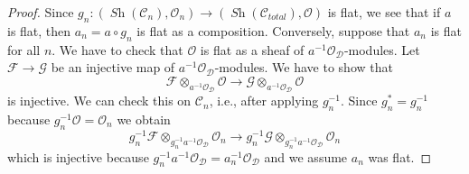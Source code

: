 \documentclass{stacks-project}
\theoremstyle{plain}
\theoremstyle{definition}
\theoremstyle{remark}
\numberwithin{equation}{subsection}
\def\Sh{\mathop{\mathit{Sh}}\nolimits}
\begin{document}
\begin{proof}
Since $g_n : (\Sh(\mathcal{C}_n), \mathcal{O}_n) \to
(\Sh(\mathcal{C}_{total}), \mathcal{O})$ is flat, we see
that if $a$ is flat, then $a_n = a \circ g_n$ is flat as
a composition. Conversely, suppose that $a_n$ is flat for all $n$.
We have to check that $\mathcal{O}$ is flat as a sheaf of
$a^{-1}\mathcal{O}_\mathcal{D}$-modules. Let $\mathcal{F} \to \mathcal{G}$
be an injective map of $a^{-1}\mathcal{O}_\mathcal{D}$-modules.
We have to show that
$$
\mathcal{F} \otimes_{a^{-1}\mathcal{O}_\mathcal{D}} \mathcal{O}
\to
\mathcal{G} \otimes_{a^{-1}\mathcal{O}_\mathcal{D}} \mathcal{O}
$$
is injective. We can check this on $\mathcal{C}_n$, i.e., after
applying $g_n^{-1}$. Since $g_n^* = g_n^{-1}$ because
$g_n^{-1}\mathcal{O} = \mathcal{O}_n$ we obtain
$$
g_n^{-1}\mathcal{F} \otimes_{g_n^{-1}a^{-1}\mathcal{O}_\mathcal{D}}
\mathcal{O}_n
\to
g_n^{-1}\mathcal{G} \otimes_{g_n^{-1}a^{-1}\mathcal{O}_\mathcal{D}}
\mathcal{O}_n
$$
which is injective because
$g_n^{-1}a^{-1}\mathcal{O}_\mathcal{D} = a_n^{-1}\mathcal{O}_\mathcal{D}$
and we assume $a_n$ was flat.
\end{proof}
\end{document}
